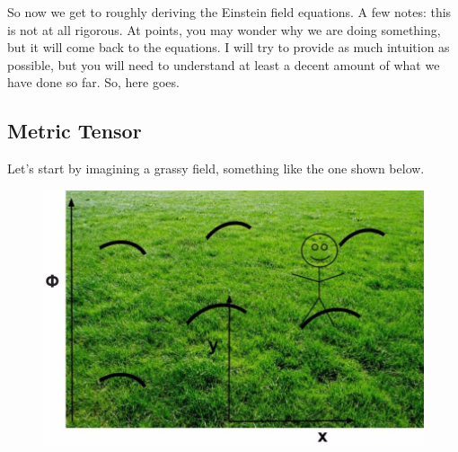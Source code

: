 So now we get to roughly deriving the Einstein field equations. A few notes: this is not at all rigorous. At points, you may wonder why we are doing
something, but it will come back to the equations. I will try to provide as much intuition as possible, but you will need to understand
at least a decent amount of what we have done so far. So, here goes.
\subsection{Metric Tensor}
Let's start by imagining a grassy field, something like the one shown below.
\begin{figure}[H]
\includegraphics[scale=0.25]{field.jpg}
\end{figure}
